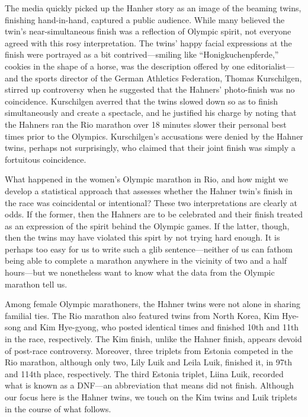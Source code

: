 \documentclass[12pt,titlepage]{article}
\begin{document}

The media quickly picked up the Hanher story as an image of the
beaming twins, finishing hand-in-hand, captured a public
audience. While many believed the twin's near-simultaneous finish was
a reflection of Olympic spirit, not everyone agreed with this rosy
interpretation. The twins' happy facial expressions at the finish were
portrayed as a bit contrived---smiling like ``Honigkuchenpferde,''
cookies in the shape of a horse, was the description offered by one
editorialist---and the sports director of the German Athletics
Federation, Thomas Kurschilgen, stirred up controversy when he
suggested that the Hahners' photo-finish was no coincidence.
Kurschilgen averred that the twins slowed down so as to finish
simultaneously and create a spectacle, and he justified his charge by
noting that the Hahners ran the Rio marathon over 18 minutes slower their
personal best times prior to the Olympics.  Kurschilgen's accusations
were denied by the Hahner twins, perhaps not surprisingly, who claimed
that their joint finish was simply a fortuitous coincidence.


What happened in the women's Olympic marathon in Rio, and how might we
develop a statistical approach that assesses whether the Hahner twin's
finish in the race was coincidental or intentional?  These two
interpretations are clearly at odds. If the former, then the Hahners
are to be celebrated and their finish treated as an expression of the
spirit behind the Olympic games. If the latter, though, then the twins
may have violated this spirt by not trying hard enough. It is perhaps
too easy for us to write such a glib sentence---neither of us can
fathom being able to complete a marathon anywhere in the vicinity of
two and a half hours---but we nonetheless want to know what the data
from the Olympic marathon tell us.


Among female Olympic marathoners, the Hahner twins were not alone in
sharing familial ties.  The Rio marathon also featured twins from
North Korea, Kim Hye-song and Kim Hye-gyong, who posted identical
times and finished 10th and 11th in the race, respectively. The Kim
finish, unlike the Hahner finish, appears devoid of post-race
controversy. Moreover, three triplets from Estonia competed in the Rio
marathon, although only two, Lily Luik and Leila Luik, finished it, in
97th and 114th place, respectively. The third Estonia triplet, Liina
Luik, recorded what is known as a DNF---an abbreviation that means did
not finish.  Although our focus here is the Hahner twins, we touch on
the Kim twins and Luik triplets in the course of what follows.
\end{document}
